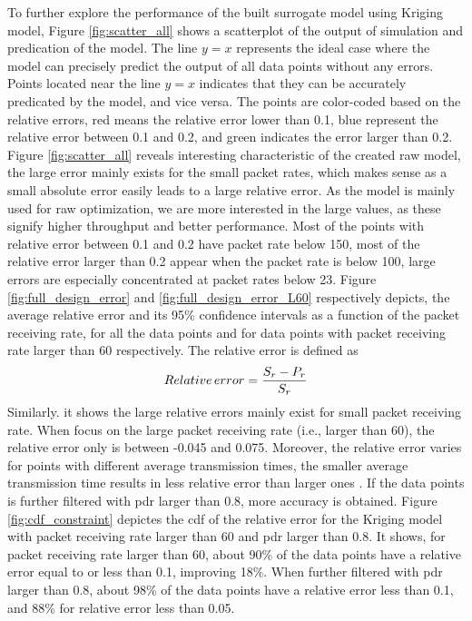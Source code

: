 To further explore the performance of the built surrogate model using Kriging model, Figure \ref{fig:scatter_all}  shows a scatterplot of the output of simulation and predication of the model.
The line  $y=x$ represents the ideal case where the model can precisely predict the output of all data points without any errors. Points located near the line $y=x$ indicates that they can be accurately predicated by the model, and vice versa. The points are color-coded based on the relative errors, red means the relative error lower than 0.1, blue represent the relative error between 0.1 and 0.2, and green indicates the error larger than 0.2. Figure \ref{fig:scatter_all} reveals interesting characteristic of the created \gls{raw} model, the large error mainly exists for the small packet rates, which makes sense as a small absolute error easily leads to a large relative error. As the model is mainly used for \gls{raw} optimization, we are more interested in the large values, as these signify higher throughput and better performance. Most of the points with relative error between 0.1 and 0.2 have packet rate below 150, most of the relative error larger than 0.2 appear when the packet rate is below 100, large errors are especially concentrated at packet rates below 23. Figure \ref{fig:full_design_error} and \ref{fig:full_design_error_L60} respectively depicts, the average relative error and its 95\% confidence intervals as a function of the packet receiving rate, for all the data points and for data points with packet receiving rate larger than 60 respectively. The relative error is defined as 
\begin{equation}
Relative \thinspace error = \frac{{S_r - P_r} }{S_r} 
\end{equation}
Similarly. it shows the large relative errors mainly exist for small packet receiving rate. When focus on the large packet receiving rate (i.e., larger than 60), the relative error only is between -0.045 and 0.075. Moreover, the relative error varies for points with different average transmission times, the smaller average transmission time results in less relative error than larger ones . If the data points is further filtered with \gls{pdr} larger than 0.8, more accuracy is obtained. Figure \ref{fig:cdf_constraint} depictes the  \gls{cdf} of the relative error for the Kriging model with packet receiving rate larger than 60 and \gls{pdr} larger than 0.8. It shows, for packet receiving rate larger than 60, about 90\% of the data points have a relative error equal to or less than 0.1, improving 18\%. When further filtered with \gls{pdr} larger than 0.8, about 98\% of the data points have a relative error less than 0.1, and 88\% for relative error less than 0.05.



